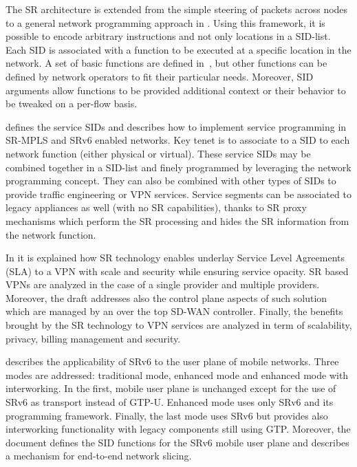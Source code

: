 The SR architecture is extended from the simple steering of packets across nodes to a general network programming approach in \cite{id-srv6-network-prog}. Using this framework, it is possible to encode arbitrary instructions and not only locations in a SID-list. Each SID is associated with a function to be executed at a specific location in the network. A set of basic functions are defined in~\cite{id-srv6-network-prog}, but other functions can be defined by network operators to fit their particular needs. Moreover, SID arguments allow functions to be provided additional context or their behavior to be tweaked on a per-flow basis.

\cite{id-sr-service-programming} defines the service SIDs and describes how to implement service programming in SR-MPLS and SRv6 enabled networks. Key tenet is to associate to a SID to each network function (either physical or virtual). These service SIDs may be combined together in a SID-list and finely programmed by leveraging the network programming concept. They can also be combined with other types of SIDs to provide traffic engineering or VPN services. Service segments can be associated to legacy appliances as well (with no SR capabilities), thanks to SR proxy mechanisms which perform the SR processing and hides the SR information from the network function.

In \cite{id-sr-for-sdwan} it is explained how SR technology enables underlay Service Level Agreements (SLA) to a VPN with scale and security while ensuring service opacity. SR based VPNs are analyzed in the case of a single provider and multiple providers. Moreover, the draft addresses also the control plane aspects of such solution which are managed by an over the top SD-WAN controller. Finally, the benefits brought by the SR technology to VPN services are analyzed in term of scalability, privacy, billing management and security.

\cite{id-srv6-mobile-uplane} describes the applicability of SRv6 to the user plane of mobile networks. Three modes are addressed: traditional mode, enhanced mode and enhanced mode with interworking. In the first, mobile user plane is unchanged except for the use of SRv6 as transport instead of GTP-U. Enhanced mode uses only SRv6 and its programming framework. Finally, the last mode uses SRv6 but provides also interworking functionality with legacy components still using GTP. Moreover, the document defines the SID functions for the SRv6 mobile user plane and describes a mechanism for end-to-end network slicing.

